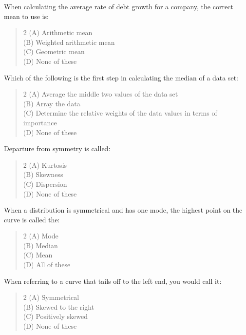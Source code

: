 \documentclass[11pt,a4paper]{article}
\begin{document}
\begin{mcqlist}
\item When calculating the average rate of debt growth for a company, the correct mean to use is:
\begin{quote}\begin{multicols}{2}
\noindent (A) Arithmetic mean \\
(B) Weighted arithmetic mean \\
(C) Geometric mean \\
(D) None of these
\end{multicols}\end{quote}

\item Which of the following is the first step in calculating the median of a data set:
\begin{quote}\begin{multicols}{2}
\noindent (A) Average the middle two values of the data set \\
(B) Array the data \\
(C) Determine the relative weights of the data values in terms of importance \\
(D) None of these
\end{multicols}\end{quote}

\item Departure from symmetry is called:
\begin{quote}\begin{multicols}{2}
\noindent (A) Kurtosis \\
(B) Skewness \\
(C) Dispersion \\
(D) None of these
\end{multicols}\end{quote}

\item When a distribution is symmetrical and has one mode, the highest point on the curve is called the:
\begin{quote}\begin{multicols}{2}
\noindent (A) Mode \\
(B) Median \\
(C) Mean \\
(D) All of these
\end{multicols}\end{quote}

\item When referring to a curve that tails off to the left end, you would call it:
\begin{quote}\begin{multicols}{2}
\noindent (A) Symmetrical \\
(B) Skewed to the right \\
(C) Positively skewed \\
(D) None of these
\end{multicols}\end{quote}


\end{mcqlist}
\end{document}
